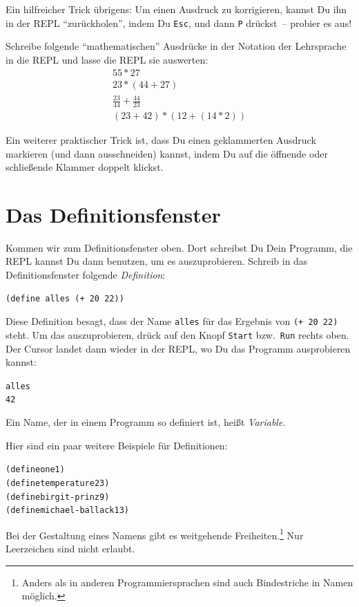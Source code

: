 Ein hilfreicher Trick übrigens: Um einen Ausdruck zu korrigieren,
kannst Du ihn in der REPL "`zurückholen"', indem Du \texttt{Esc}, und
dann \texttt{P} drückst~-- probier es aus!

\begin{aufgabe}
  Schreibe folgende "`mathematischen"' Ausdrücke in der Notation der
  Lehrsprache in die REPL und lasse die REPL sie auswerten:
  \begin{displaymath}
    \begin{array}{c}
      55 * 27\\
      23 * (44 + 27)\\
      \frac{23}{44} + \frac{44}{23}\\
      (23 + 42) * (12 + (14 * 2))
    \end{array}
  \end{displaymath}
\end{aufgabe}
%
Ein weiterer praktischer Trick ist, dass Du einen geklammerten
Ausdruck markieren (und dann ausschneiden) kannst, indem Du auf die
öffnende oder schließende Klammer doppelt klickst.

\section{Das Definitionsfenster}

Kommen wir zum Definitionsfenster oben.  Dort schreibst Du Dein
Programm, die REPL kannst Du dann benutzen, um es auszuprobieren.
Schreib in das Definitionsfenster folgende
\textit{Definition}:
%
\begin{verbatim}
(define alles (+ 20 22))
\end{verbatim}
%
Diese Definition besagt, dass der Name \texttt{alles} für das Ergebnis
von \texttt{(+ 20 22)} steht.  Um das auszuprobieren, drück auf den
Knopf \texttt{Start} bzw.\ \texttt{Run} rechts oben.  Der Cursor
landet dann wieder in der REPL, wo Du das Programm ausprobieren
kannst:
%
\begin{alltt}
alles
\evalsto{} 42
\end{alltt}
%
Ein Name, der in einem Programm so definiert ist, heißt
\textit{Variable}.

Hier sind ein paar weitere Beispiele für Definitionen:
%
\begin{alltt}
(define one 1)
(define temperature 23)
(define birgit-prinz 9)
(define michael-ballack 13)
\end{alltt}
%
Bei der Gestaltung eines Namens gibt es weitgehende
Freiheiten.\footnote{Anders als in anderen Programmiersprachen sind
  auch Bindestriche in Namen möglich.}  Nur Leerzeichen sind nicht
erlaubt.

